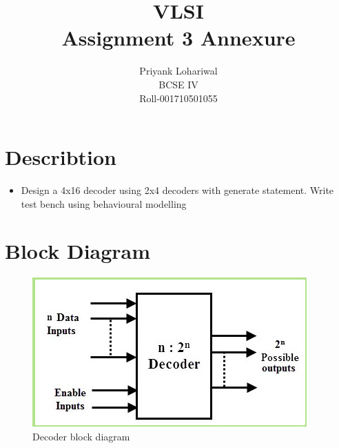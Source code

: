 \documentclass[titlepage]{article}
\title{VLSI \\Assignment 3 Annexure}
\author{Priyank Lohariwal\\BCSE IV\\Roll-001710501055}
\date{}
\begin{document}
    {\maketitle}

    \section{Describtion}
    \begin{itemize}
        \item Design a 4x16 decoder using 2x4 decoders with generate statement. Write test bench using behavioural modelling
    \end{itemize}

    \section{Block Diagram} 
    \begin{figure}[!ht]
        \centering
        \includegraphics{./figures/Decoder-Block-Diagram.jpg}
        \caption{Decoder block diagram}
    \end{figure}
\end{document}
